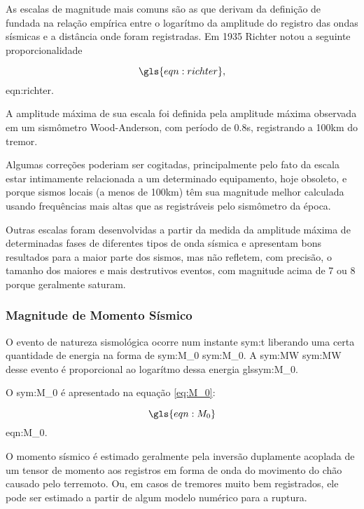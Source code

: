 As escalas de magnitude mais comuns são as que derivam da definição de \citet{richter_1935}
fundada na relação empírica entre o logarítmo da amplitude do registro das ondas sísmicas e a distância onde foram
registradas. Em 1935 Richter notou a seguinte proporcionalidade

\begin{equation}
	\gls{eqn:richter},
	\label{eq:richter}
\end{equation}
\glsdesc*{eqn:richter}.


A amplitude máxima de sua
escala foi definida pela amplitude máxima observada em um sismômetro Wood-Anderson, com período de 0.8s, registrando a 100km 
do tremor.

Algumas correções poderiam ser cogitadas, principalmente pelo fato da escala estar intimamente 
relacionada a um determinado equipamento, hoje obsoleto, e porque sismos locais (a menos de 100km) têm sua magnitude
melhor calculada usando frequências mais altas que as registráveis pelo sismômetro da época.


Outras escalas foram desenvolvidas a partir da medida da amplitude máxima de determinadas fases 
de diferentes tipos de onda sísmica e apresentam bons resultados para a maior parte dos sismos, 
mas não refletem, com precisão, 
o tamanho dos maiores e mais destrutivos eventos, com magnitude acima de 7 ou 8 porque geralmente saturam.


\subsubsection{Magnitude de Momento Sísmico }
\label{sec:risco_sismico}

O evento de natureza sismológica ocorre num
instante \gls{sym:t} liberando uma certa quantidade de energia na forma de \glsdesc{sym:M_0}
\gls{sym:M_0}. A \glsdesc{sym:MW} \gls{sym:MW} desse evento é proporcional ao logarítmo dessa energia gls{sym:M_0}.

O \glsdesc{sym:M_0} é apresentado na equação \eqref{eq:M_0}:

\begin{equation}
	\gls{eqn:M_0}
	\label{eq:M_0}
\end{equation}
\glsdesc*{eqn:M_0}.

O momento sísmico é estimado geralmente pela inversão duplamente acoplada de um tensor de momento aos registros em 
forma de onda do movimento do chão causado pelo terremoto. Ou, em casos de tremores muito bem registrados, ele pode
ser estimado a partir de algum modelo numérico para a ruptura.

